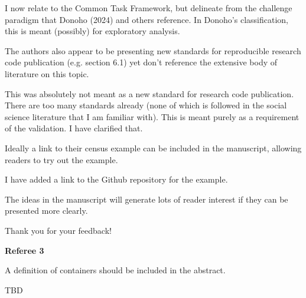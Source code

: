 \begin{response}
    I now relate to the Common Task Framework, but delineate from the challenge paradigm that Donoho (2024) and others reference. In Donoho's classification, this is meant (possibly) for exploratory analysis. 
\end{response}

\begin{referee}

The authors also appear to
be presenting new standards for reproducible research code publication (e.g. section 6.1) yet don't
reference the extensive body of literature on this topic. 

\end{referee}

\begin{response}
    This was absolutely not meant as a new standard for research code publication. There are too many standards already (none of which is followed in the social science literature that I am familiar with). This is meant purely as a requirement of the validation. I have clarified that.
\end{response}

\begin{referee}
    
Ideally a link to their census example can be
included in the manuscript, allowing readers to try out the example. 

\end{referee}

\begin{response}
    I have added a link to the Github repository for the example.
\end{response}


\begin{referee}
The ideas in the manuscript will
generate lots of reader interest if they can be presented more clearly.
\end{referee}

\begin{response}
    Thank you for your feedback!
\end{response}


\textbf{Referee 3}

\begin{referee}
    A definition of containers should be included in the abstract. 
\end{referee}

\begin{response}
    TBD
\end{response}



